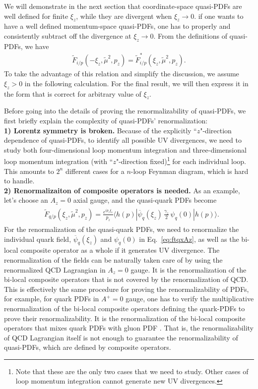 We will demonstrate in the next section that coordinate-space quasi-PDFs are well defined for finite $\xi_z$, while they are divergent when $\xi_z\to0$.  if one wants to have a well defined momentum-space quasi-PDFs, one has to properly and consistently subtract off the divergence at $\xi_z\to0$.  From the definitions of quasi-PDFs, we have
\begin{align}
\tilde{F}_{i/p}(-\xi_z,\tilde{\mu}^2,p_z)=\tilde{F}_{i/p}^*(\xi_z,\tilde{\mu}^2,p_z).
\end{align}
To take the advantage of this relation and simplify the discussion, we assume $\xi_z>0$ in the following calculation.  For the final result, we will then express it in the form that is correct for arbitrary value of $\xi_z$.

Before going into the details of proving the renormalizability of quasi-PDFs, we first briefly explain the complexity of quasi-PDFs' renormalization:\\
{\bf 1) Lorentz symmetry is broken.} Because of the explicitly ``$z$"-direction dependence of quasi-PDFs, to identify all possible UV divergences, we need to study both four-dimensional loop momentum integration and three-dimensional loop momentum integration (with ``$z$"-direction fixed)\footnote{Note that these are the only two cases that we need to study. Other cases of loop momentum integration cannot generate new UV divergences.} for each individual loop. This amounts to $2^n$ different cases for a $n$-loop Feynman diagram, which is hard to handle.\\
{\bf 2) Renormalizaiton of composite operators is needed.} As an example, let's choose an $A_z=0$ axial gauge, and the quasi-quark PDFs become
\begin{align}\label{eq:ftqxAz}
\begin{split}
&\tilde{F}_{q/p}(\xi_z,\tilde{\mu}^2,p_z)= \frac{e^{i p_z \xi_z}}{p_z} \left. \langle h(p)| \overline{\psi}_q(\xi_z)\,\frac{\gamma_z}{2}\, \psi_q(0) | h(p) \rangle\right. .
\end{split}
\end{align}
For the renormalization of the quasi-quark PDFs, we need to renormalize the individual quark field, $\overline{\psi}_q(\xi_z)$ and $\psi_q(0)$ in Eq.~\eqref{eq:ftqxAz}, as well as the bi-local composite operator as a whole if it generates UV divergence.  The renormalization of the fields can be naturally taken care of by using the renormalized QCD Lagrangian in $A_z=0$ gauge.  It is the renormalization of the bi-local composite operators that is not covered by the renormalization of QCD.  This is effectively the same procedure for proving the renormalizability of PDFs, for example, for quark PDFs in $A^+=0$ gauge, one has to verify the multiplicative renormalization of the bi-local composite operators defining the quark-PDFs to prove their renormalizability.  It is the renormalization of the bi-local composite operators that mixes quark PDFs with gluon PDF \cite{Collins:1981uw}.  That is, the renormalizability of QCD Lagrangian itself is not enough to guarantee the renormalizability of quasi-PDFs, which are defined by composite operators.


